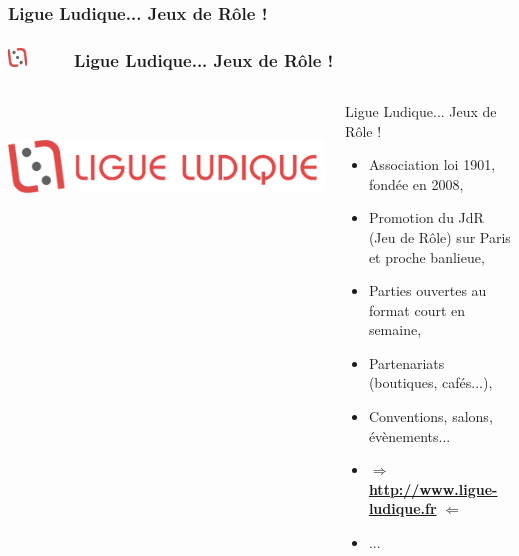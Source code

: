 \documentclass[slidetop,11pt]{beamer}
\def\sectionPartIaUN{Ligue Ludique... Jeux de R{\^o}le ! }
\def\moreInFrameTitleLeftt{\includegraphics[height=0.5cm]{img/ligueludique-0.png}~~~~~}
\begin{document}
\subsubsection{\sectionPartIaUN}
\begin{frame}
	\frametitle{\moreInFrameTitleLeftt \sectionPartIaUN}
	\begin{columns}[T]
		\begin{column}[T]{3.5cm}
			\includegraphics[height=3.4cm]{img/ligueludique-1.png} %
		\end{column}
		\begin{column}[T]{7cm}
			 \begin{beamerboxesrounded}	[lower=substructureRED, %
							 upper=block title RED,%
							 shadow=true]%
				   {\sectionPartIaUN}
				\begin{itemize}
					\item Association loi 1901, fond{\'e}e en 2008, 
					\item Promotion du JdR (Jeu de R{\^o}le) sur Paris et proche banlieue, 
					\item Parties ouvertes au format court en semaine, 
					\item Partenariats (boutiques, caf{\'e}s...), 
					\item Conventions, salons, {\'e}v{\`e}nements... 
					\item $\Rightarrow$ \underline{\textbf{http://www.ligue-ludique.fr}} $\Leftarrow$
					\item ...
				\end{itemize}
			\end{beamerboxesrounded}
		\end{column}
	\end{columns}
\end{frame}
\end{document}
